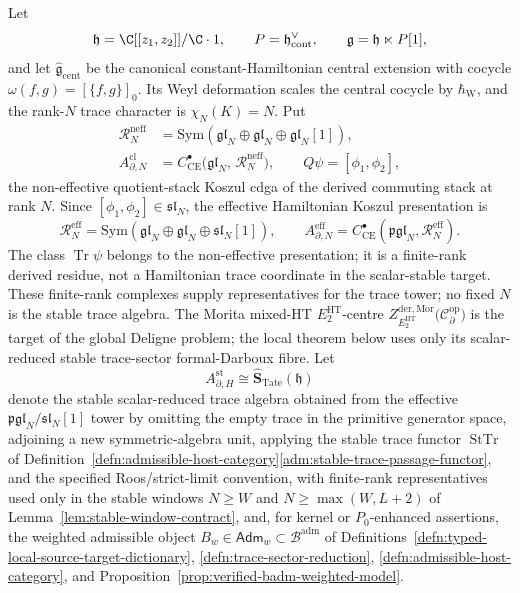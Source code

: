 \documentclass[11pt]{memoir}
\begin{document}
  \begin{thm}\label{thm:intro-main-formal-darboux}
    Let
    \[
      \mathfrak h=\C[[z_1,z_2]]/\C\cdot1,\qquad
      P=\mathfrak h^\vee_{\mathrm{cont}},\qquad
      \mathfrak g=\mathfrak h\ltimes P[1],
    \]
    and let \(\widehat{\mathfrak g}_{\mathrm{cent}}\) be the canonical
    constant-Hamiltonian central extension with cocycle
    \(\omega(f,g)=[\{f,g\}]_0\).  Its Weyl deformation scales the
    central cocycle by \(\hbar_{\mathrm W}\), and the rank-\(N\) trace
    character is \(\chi_N(K)=N\).  Put
    \[
      \begin{aligned}
      \mathcal R_N^{\mathrm{neff}}
        &=
        \mathrm{Sym}(\mathfrak{gl}_N\oplus\mathfrak{gl}_N
        \oplus\mathfrak{gl}_N[1]),\\
      A^{\mathrm{cl}}_{\partial,N}
        &=
        C^\bullet_{\mathrm{CE}}\bigl(\mathfrak{gl}_N,\,
        \mathcal R_N^{\mathrm{neff}}\bigr),
        \qquad Q\psi=[\phi_1,\phi_2],
      \end{aligned}
    \]
    the non-effective quotient-stack Koszul cdga of the derived commuting
    stack at rank \(N\).  Since
    \([\phi_1,\phi_2]\in\mathfrak{sl}_N\), the effective Hamiltonian
    Koszul presentation is
    \[
      \mathcal R_N^{\mathrm{eff}}
      =
      \mathrm{Sym}(\mathfrak{gl}_N\oplus\mathfrak{gl}_N
        \oplus\mathfrak{sl}_N[1]),
      \qquad
      A^{\mathrm{eff}}_{\partial,N}
      =
      C^\bullet_{\mathrm{CE}}(\mathfrak{pgl}_N,\mathcal R_N^{\mathrm{eff}}).
    \]
    The class \(\operatorname{Tr}\psi\) belongs to the non-effective
    presentation; it is a finite-rank derived residue, not a Hamiltonian
    trace coordinate in the scalar-stable target.  These finite-rank
    complexes supply representatives for
    the trace tower; no fixed \(N\) is the stable trace algebra.  The
    Morita mixed-HT \(E_2^{\mathrm{HT}}\)-centre
    \(Z^{\mathrm{der},\mathrm{Mor}}_{E_2^{\mathrm{HT}}}\!
    \bigl(\mathcal C^{\mathrm{op}}_\partial\bigr)\) is the target of the
    global Deligne problem; the local theorem below uses only its
    scalar-reduced stable trace-sector formal-Darboux fibre.  Let
    \[
      A_{\partial,H}^{\mathrm{st}}
      \cong
      \widehat{\mathbf S}_{\mathrm{Tate}}(\mathfrak h)
    \]
    denote the stable scalar-reduced trace algebra obtained from the
    effective \(\mathfrak{pgl}_N/\mathfrak{sl}_N[1]\) tower by omitting
    the empty trace in the primitive generator space, adjoining a new
    symmetric-algebra unit, applying the stable trace functor
    \(\operatorname{StTr}\) of
    Definition~\ref{defn:admissible-host-category}\ref{adm:stable-trace-passage-functor},
    and the specified Roos/strict-limit convention, with finite-rank representatives used
    only in the stable windows
    \(N\geq W\) and \(N\geq\max(W,L+2)\) of
    Lemma~\ref{lem:stable-window-contract}, and, for kernel or
    \(P_0\)-enhanced assertions, the weighted admissible object
    \(B_w\in\mathsf{Adm}_w\subset\mathcal B^{\mathrm{adm}}\) of
    Definitions~\ref{defn:typed-local-source-target-dictionary},
    \ref{defn:trace-sector-reduction},
    \ref{defn:admissible-host-category}, and
    Proposition~\ref{prop:verified-badm-weighted-model}.


\end{thm}
\end{document}
